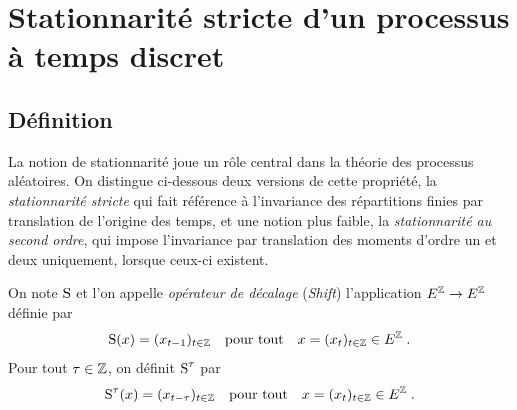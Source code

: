 



\section{Stationnarit\'e stricte d'un processus \`a temps discret}
\subsection{D\'efinition}
La notion de stationnarit\'e joue un r\^ole central dans la th\'eorie
des processus al\'eatoires. On distingue ci-dessous deux versions de cette
propri\'et\'e, la \emph{stationnarit\'e stricte} qui fait r\'ef\'erence \`a l'invariance des r\'epartitions finies par translation de l'origine des temps,
et une notion plus faible, la \emph{stationnarit\'e
au second ordre}, qui impose l'invariance par translation des moments
d'ordre un et deux uniquement, lorsque ceux-ci existent.




\begin{definition}
\label{def:retard}
On note $\operatorname{S}$ et l'on appelle \emph{op\'erateur de d\'ecalage} (\emph{Shift}) l'application $E^{\mathbb{Z}}\to E^{\mathbb{Z}}$ d\'efinie par
$$
\operatorname{S}(x)= (x_{t-1})_{t\in \mathbb{Z}}\quad \text{pour tout}\quad x=(x_t)_{t \in \mathbb{Z}} \in E^{\mathbb{Z}}\;.
$$
Pour tout $\tau\in \mathbb{Z}$, on d\'efinit $\operatorname{S}^\tau$ par
$$
\operatorname{S}^\tau(x)= (x_{t-\tau})_{t\in \mathbb{Z}}\quad \text{pour tout}\quad x=(x_t)_{t \in \mathbb{Z}} \in E^{\mathbb{Z}}\;.
$$
\end{definition}


